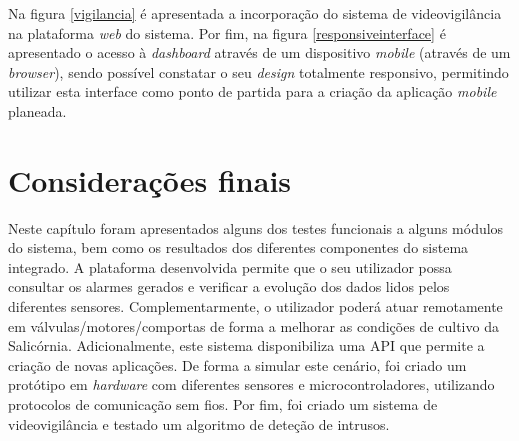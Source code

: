 Na figura \ref{vigilancia} é apresentada a incorporação do sistema de videovigilância na plataforma \textit{web} do sistema. Por fim, na figura \ref{responsiveinterface} é apresentado o acesso à \textit{dashboard} através de um dispositivo \textit{mobile} (através de um \textit{browser}), sendo possível constatar o seu \textit{design} totalmente responsivo, permitindo utilizar esta interface como ponto de partida para a criação da aplicação \textit{mobile} planeada. 

\section{Considerações finais}

Neste capítulo foram apresentados alguns dos testes funcionais a alguns módulos do sistema, bem como os resultados dos diferentes componentes do sistema integrado.  A plataforma desenvolvida permite que o seu utilizador possa consultar os alarmes gerados e verificar a evolução dos dados lidos pelos diferentes sensores. Complementarmente, o utilizador poderá atuar remotamente em válvulas/motores/comportas de forma a melhorar as condições de cultivo da Salicórnia. Adicionalmente, este sistema disponibiliza uma API que permite a criação de novas aplicações. De forma a simular este cenário, foi criado um protótipo em \textit{hardware} com diferentes sensores e microcontroladores, utilizando protocolos de comunicação sem fios. Por fim, foi criado um sistema de videovigilância e testado um algoritmo de deteção de intrusos. 


